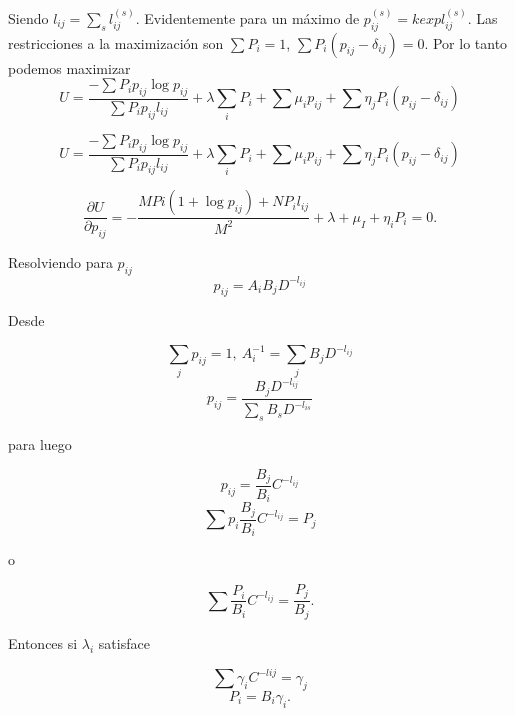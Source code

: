 Siendo $l_{ij}=\sum_{s}l _{ij}^{(s)}$. Evidentemente para un m\'aximo de 
$p_{ij}^{(s)}=k exp l_{ij}^{(s)}$. Las restricciones a la maximizaci\'on son 
$\sum P_{i} = 1$, $\sum P_{i}(p_{ij}-\delta_{ij})=0$. Por lo tanto podemos maximizar 
\begin{equation}
U=\frac{-\sum P_{i}p_{ij}\log p_{ij}}{\sum P_{i}p_{ij}l_{ij}}+\lambda \sum _{i}P_{i}+\sum\mu _{i}p_{ij}+\sum\eta _{j}P_{i}(p_{ij}-\delta_{ij})
\end{equation}

\begin{equation}
U=\frac{-\sum P_{i}p_{ij}\log p_{ij}}{\sum P_{i}p_{ij}l_{ij}}+\lambda \sum _{i}P_{i}+\sum\mu _{i}p_{ij}+\sum\eta _{j}P_{i}(p_{ij}-\delta_{ij})
\end{equation}

\begin{equation}
\frac {\partial U}{\partial p_{ij}}=-\frac{MP{i}(1+\log p_{ij})+NP_{i}l_{ij}}{M^{2}}+\lambda+\mu_{I}+\eta _{i}P_{i}=0.
\end{equation}

Resolviendo para $p_{ij}$
\begin{equation}
p_{ij}=A_{i}B_{j}D^{-l_{ij}}
\end{equation}

Desde

\begin{equation}
\sum _{j}p_{ij}=1,\ A_{i}^{-1}=\sum_{j}B_{j}D^{-l_{ij}}
\end{equation}
\begin{equation}
p_{ij}=\frac{B_{j}D^{-l_{ij}}}{\sum_{s}B_{s}D^{-l_{is}}}
\end{equation}

para luego

\begin{equation}
p_{ij}=\frac{B_{j}}{B_{i}}C^{-l_{ij}}
\end{equation}
\begin{equation}
\sum p_{i}\frac{B_{j}}{B_{i}}C^{-l_{ij}}=P_{j}
\end{equation}

o

\begin{equation}
\sum \frac{P_{i}}{B_{i}}C^{-l_{ij}}=\frac {P_{j}}{B_{j}}.
\end{equation}

Entonces si $\lambda_{i}$ satisface

\begin{equation}
\sum\gamma _{i}C^{-lij}=\gamma_{j}
\end{equation}
\begin{equation}
P_{i}=B_{i}\gamma _{i}.
\end{equation}

